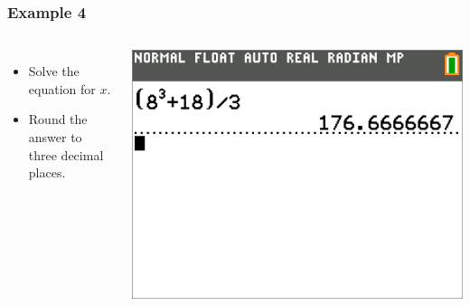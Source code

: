 \documentclass[aspectratio=169,17pt]{beamer}
\begin{document}
\begin{frame}
	\frametitle{Example 4}
	\begin{columns}
		\begin{itemize} \small
			\item Solve the equation for $x$.
			\item Round the answer to three decimal places.
		\end{itemize}
			\includegraphics[width=\textwidth]{Capture 3.png}
	\end{columns}
\end{frame}
\end{document}
